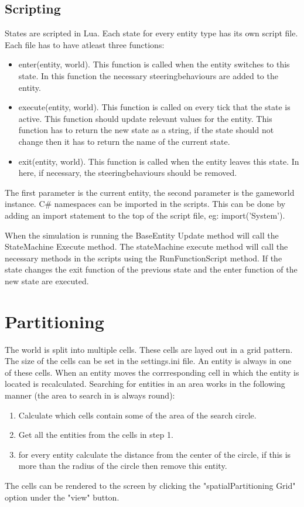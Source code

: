 \documentclass{article}
\begin{document}
   \subsection {Scripting}
   States are scripted in Lua. Each state for every entity type has its own script file. Each file has to have atleast three functions: 
   \begin{itemize}
   \item enter(entity, world). This function is called when the entity switches to this state. In this function the necessary steeringbehaviours are added to the entity.
   \item execute(entity, world). This function is called on every tick that the state is active. This function should update relevant values for the entity. This function has to return the new state as a string, if the state should not change then it has to return the name of the current state.
   \item exit(entity, world). This function is called when the entity leaves this state. In here, if necessary, the steeringbehaviours should be removed.
   \end{itemize}
   The first parameter is the current entity, the second parameter is the gameworld instance. C\# namespaces can be imported in the scripts. This can be done by adding an import statement to the top of the script file, eg: import('System').
   
   When the simulation is running the BaseEntity Update method will call the StateMachine Execute method. The stateMachine execute method will call the necessary methods in the scripts using the RunFunctionScript method. If the state changes the exit function of the previous state and the enter function of the new state are executed.
   
   \newpage
   \section {Partitioning}
   The world is split into multiple cells. These cells are layed out in a grid pattern. The size of the cells can be set in the settings.ini file. An entity is always in one of these cells. When an entity moves the corrresponding cell in which the entity is located is recalculated. Searching for entities in an area works in the following manner (the area to search in is always round):
   \begin{enumerate}
   \item Calculate which cells contain some of the area of the search circle.
   \item Get all the entities from the cells in step 1.
   \item for every entity calculate the distance from the center of the circle, if this is more than the radius of the circle then remove this entity.
   \end{enumerate}
   The cells can be rendered to the screen by clicking the "spatialPartitioning Grid" option under the "view" button. 
   
\end{document}
